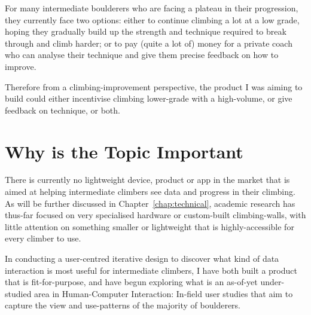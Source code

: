 For many intermediate boulderers who are facing a plateau in their progression, they currently face two options: either to continue climbing a lot at a low grade, hoping they gradually build up the strength and technique required to break through and climb harder; or to pay (quite a lot of) money for a private coach who can analyse their technique and give them precise feedback on how to improve.

Therefore from a climbing-improvement perspective, the product I was aiming to build could either incentivise climbing lower-grade with a high-volume, or give feedback on technique, or both.



\section{Why is the Topic Important}



There is currently no lightweight device, product or app in the market that is aimed at helping intermediate climbers see data and progress in their climbing.
As will be further discussed in Chapter~\ref{chap:technical}, academic research has thus-far focused on very specialised hardware or custom-built climbing-walls, with little attention on something smaller or lightweight that is highly-accessible for every climber to use.


In conducting a user-centred iterative design to discover what kind of data interaction is most useful for intermediate climbers, I have both built a product that is fit-for-purpose, and have begun exploring what is an as-of-yet under-studied area in Human-Computer Interaction:
In-field user studies that aim to capture the view and use-patterns of the majority of boulderers.




